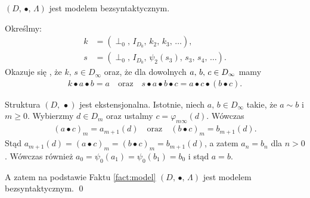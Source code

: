 \begin{twierdzenie}
  \((D,\,\bullet,\,\Lambda)\) jest modelem bezsyntaktycznym.
\end{twierdzenie}
\begin{dowod}
Określmy:
\begin{align*}
  k &=(\perp_0,\,I_{D_0},\,k_2,\,k_3,\,\dots),\\
  s &=(\perp_0,\,I_{D_0},\,\psi_2(s_3),\,s_3,\,s_4,\,\dots).
\end{align*}
Okazuje się \cite[Tw. 16.51, 16.53]{Hindley:2008:LCI:1388400}, że \(k,\,s\in D_\infty\) oraz, że dla dowolnych \(a,\,b,\,c\in\nobreak D_\infty\) mamy
\begin{align*}
  k\bullet a \bullet b = a\quad \text{oraz}\quad s\bullet a\bullet b\bullet c = a\bullet c\bullet (b\bullet c).
\end{align*}

Struktura \((D,\,\bullet)\) jest ekstensjonalna. Istotnie, niech \(a,\,b\in D_\infty\) takie, że \(a\sim b\) i \(m\geq 0\). Wybierzmy \(d\in D_m\) oraz ustalmy \(c=\varphi_{m\infty}(d)\). Wówczas \cite[Tw. 16.54]{Hindley:2008:LCI:1388400}
\begin{align*}
  (a\bullet c)_m = a_{m+1}(d)\quad\text{oraz}\quad (b\bullet c)_m = b_{m+1}(d).
\end{align*}
Stąd \(a_{m+1}(d)=(a\bullet c)_m = (b\bullet c)_m = b_{m+1}(d)\), a zatem \(a_n = b_n\) dla \(n>0\). Wówczas również \(a_0=\psi_0(a_1)=\psi_0(b_1)=b_0\) i stąd \(a=b\).

  A zatem na podstawie Faktu \ref{fact:model} \((D,\,\bullet,\,\Lambda)\) jest modelem bezsyntaktycznym. \qed
\end{dowod}
